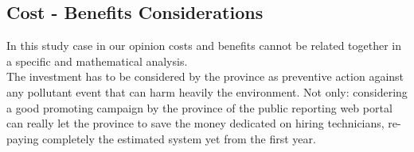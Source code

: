\subsection{Cost - Benefits Considerations}
In this study case in our opinion costs and benefits cannot be related together in a specific and mathematical analysis. \\
The investment has to be considered by the province as preventive action against any pollutant event that can harm heavily the environment.
Not only: considering a good promoting campaign by the province of the public reporting web portal can really let the province to save the money dedicated on hiring technicians, re-paying completely the estimated system yet from the first year.
